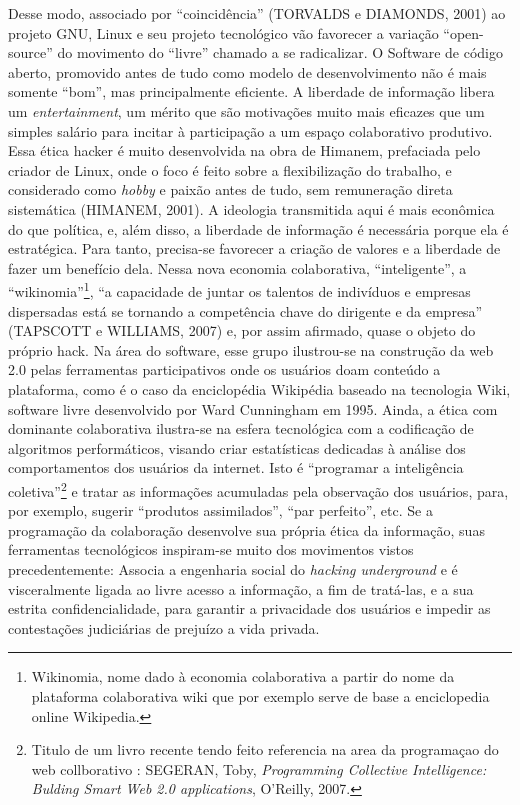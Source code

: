Desse modo, associado por “coincidência” (TORVALDS e DIAMONDS, 2001) ao projeto GNU, Linux e seu projeto tecnológico vão favorecer a variação “open-source” do movimento do “livre” chamado a se radicalizar. O Software de código aberto, promovido antes de tudo como modelo de desenvolvimento não é mais somente “bom”, mas principalmente eficiente. A liberdade de informação libera um \emph{entertainment}, um mérito que são motivações muito mais eficazes que um simples salário para incitar à participação a um espaço colaborativo produtivo. Essa ética hacker é muito desenvolvida na obra de Himanem, prefaciada pelo criador de Linux, onde o foco é feito sobre a flexibilização do trabalho, e considerado como \emph{hobby} e paixão antes de tudo, sem remuneração direta sistemática (HIMANEM, 2001). A ideologia transmitida aqui é mais econômica do que política, e, além disso, a liberdade de informação é necessária porque ela é estratégica. Para tanto, precisa-se favorecer a criação de valores e a liberdade de fazer um benefício dela. Nessa nova economia colaborativa, “inteligente”, a “wikinomia”\footnote{Wikinomia, nome dado à economia colaborativa a partir do nome da plataforma colaborativa wiki que por exemplo serve de base a enciclopedia online Wikipedia.}, “a capacidade de juntar os talentos de indivíduos e empresas dispersadas está se tornando a competência chave do dirigente e da empresa” (TAPSCOTT e WILLIAMS, 2007) e, por assim afirmado, quase o objeto do próprio hack. Na área do software, esse grupo ilustrou-se na construção da web 2.0 pelas ferramentas participativos onde os usuários doam conteúdo a plataforma, como é o caso da enciclopédia Wikipédia baseado na tecnologia Wiki, software livre desenvolvido por Ward Cunningham em 1995. Ainda, a ética com dominante colaborativa ilustra-se na esfera tecnológica com a codificação de algoritmos performáticos, visando criar estatísticas dedicadas à análise dos comportamentos dos usuários da internet. Isto é “programar a inteligência coletiva”\footnote{Titulo de um livro recente tendo feito referencia na area da programaçao do web collborativo : SEGERAN, Toby, \emph{Programming Collective Intelligence: Bulding Smart Web 2.0 applications}, O'Reilly, 2007.} e tratar as informações acumuladas pela observação dos usuários, para, por exemplo, sugerir “produtos assimilados”, “par perfeito”, etc. Se a programação da colaboração desenvolve sua própria ética da informação, suas ferramentas tecnológicos inspiram-se muito dos movimentos vistos precedentemente: Associa a engenharia social do \emph{hacking underground} e é visceralmente ligada ao livre acesso a informação, a fim de tratá-las, e a sua estrita confidencialidade, para garantir a privacidade dos usuários e impedir as contestações judiciárias de prejuízo a vida privada.

